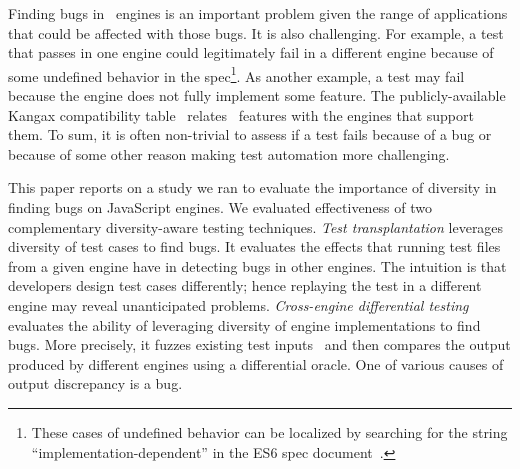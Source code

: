 \documentclass[10pt,conference,anonymous]{IEEEtran}
\begin{document}
Finding bugs in \js\ engines is an important problem given the range
of applications that could be affected with those
bugs. It is also
challenging. For example, a test that passes in one engine could
legitimately fail in a different engine because of some undefined
behavior in the spec\footnote{These cases of undefined behavior can be
  localized by searching for the string ``implementation-dependent''
  in the ES6 spec document~\cite{ecmas262-spec}.}. As another example,
a test may fail because the engine does not fully implement some
feature. The publicly-available Kangax compatibility
table~\cite{kangax} relates \js\ features with the engines that
support them. To sum, it is often non-trivial to assess if a test
fails because of a bug or because of some other reason making test
automation more challenging.


This paper reports on a study we ran to evaluate the importance of
diversity in finding bugs on JavaScript engines. We evaluated
effectiveness of two complementary diversity-aware testing
techniques. \emph{Test transplantation} leverages diversity of test
cases to find bugs. It evaluates the effects that running \js{} test
files from a given engine have in detecting bugs in other engines. The
intuition is that developers design test cases differently; hence
replaying the test in a different engine may reveal unanticipated
problems. \emph{Cross-engine differential testing} evaluates the
ability of leveraging diversity of engine implementations to find
bugs. More precisely, it fuzzes existing test
inputs~\cite{fuzz-testing-history} and then compares the output
produced by different engines using a differential oracle. One of
various causes of output discrepancy is a bug.

\end{document}
